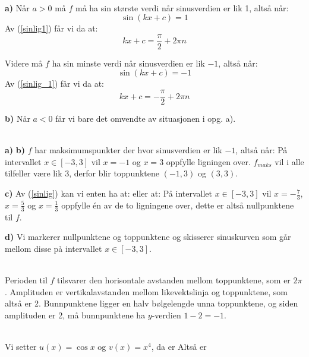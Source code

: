 \\
\textbf{a)} Når $ a>0 $ må $ f $ må ha sin største verdi når sinusverdien er lik 1, altså når:
\[ \sin(kx + c) = 1 \]
Av (\ref{sinlig1}) får vi da at:
\[ kx +c = \frac{\pi}{2}+ 2\pi n \]

Videre må $ f $ ha sin minste verdi når sinusverdien er lik $ -1 $, altså når:
\[ \sin(kx + c) = -1 \]
Av (\ref{sinlig_1}) får vi da at:
\[ kx +c = -\frac{\pi}{2}+2\pi n \]

\textbf{b)} Når $ a<0 $ får vi bare det omvendte av situasjonen i opg. a).\vsk 

\\
\textbf{a)} 
\textbf{b)} $ f $ har maksimumspunkter der hvor sinusverdien er lik $ -1 $, altså når:
På intervallet $ x\in[-3, 3] $ vil $ x=-1 $ og $ x=3 $ oppfylle ligningen over. $ f_{maks} $ vil i alle tilfeller være lik 3, derfor blir toppunktene $ (-1, 3) $ og $ (3, 3) $.\vsk

\textbf{c)} 
Av (\ref{sinlig}) kan vi enten ha at:
eller at:
På intervallet $ x\in[-3, 3] $ vil $ x=-\frac{7}{3} $, $ x=\frac{5}{3} $ og $ x=\frac{1}{3} $ oppfylle én av de to ligningene over, dette er altså nullpunktene til $ f $.

\textbf{d)} Vi markerer nullpunktene og toppunktene og skisserer sinuskurven som går mellom disse på intervallet $ x\in[-3, 3] $.\vsk

\\
Perioden til $ f $ tilsvarer den horisontale avstanden mellom toppunktene, som er $ 2\pi $. Amplituden er vertikalavstanden mellom likevektslinja og toppunktene, som altså er 2. Bunnpunktene ligger en halv bølgelengde unna toppunktene, og siden amplituden er 2, må bunnpunktene ha $ y $-verdien $ 1-2=-1 $.


\\
Vi setter $ u(x)=\cos x $ og $ v(x)=x^4 $, da er
Altså er
 \vsk


